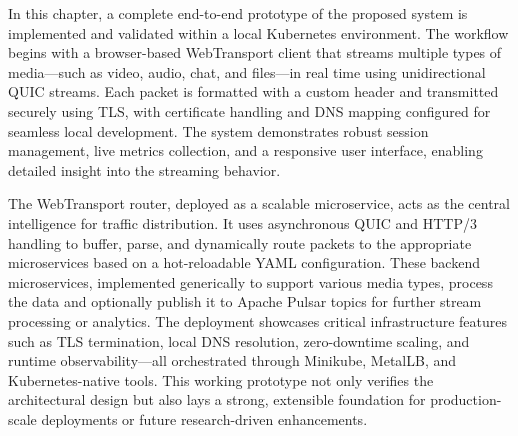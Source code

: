 In this chapter, a complete end-to-end prototype of the proposed system is implemented and validated within a local Kubernetes environment. The workflow begins with a browser-based WebTransport client that streams multiple types of media—such as video, audio, chat, and files—in real time using unidirectional QUIC streams. Each packet is formatted with a custom header and transmitted securely using TLS, with certificate handling and DNS mapping configured for seamless local development. The system demonstrates robust session management, live metrics collection, and a responsive user interface, enabling detailed insight into the streaming behavior.

The WebTransport router, deployed as a scalable microservice, acts as the central intelligence for traffic distribution. It uses asynchronous QUIC and HTTP/3 handling to buffer, parse, and dynamically route packets to the appropriate microservices based on a hot-reloadable YAML configuration. These backend microservices, implemented generically to support various media types, process the data and optionally publish it to Apache Pulsar topics for further stream processing or analytics. The deployment showcases critical infrastructure features such as TLS termination, local DNS resolution, zero-downtime scaling, and runtime observability—all orchestrated through Minikube, MetalLB, and Kubernetes-native tools. This working prototype not only verifies the architectural design but also lays a strong, extensible foundation for production-scale deployments or future research-driven enhancements.